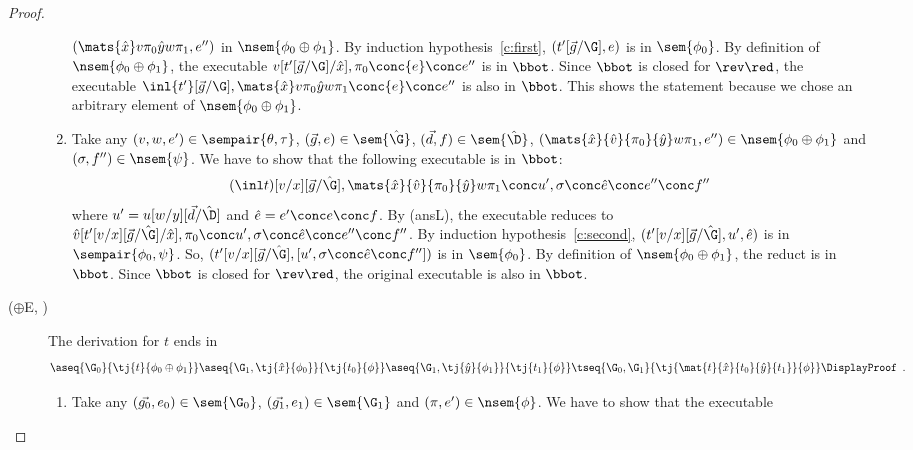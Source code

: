 \begin{proof}
\begin{description}
\begin{enumerate}[label=\textit{(\arabic{*})}]
	       $(\mats {\hat x}v{\pi_0}{\hat y}w{\pi_1}, e'')$
	       in $\nsem{\phi_0\oplus\phi_1}$.
	       By induction hypothesis~\ref{c:first},
	       $(t'[\vec g/\G], e)$ is in $\sem{\phi_0}$.
	       By definition of $\nsem{\phi_0\oplus\phi_1}$,
	       the executable
	       $v[t'[\vec g/\G]/\hat x],\pi_0\conc{e}\conc e''$
	       is in
	       $\bbot$.
	       Since $\bbot$ is closed for $\rev\red$,
	       the executable
	       $\inl{t'}[\vec g/\G], \mats {\hat x}v{\pi_0}{\hat
	       y}w{\pi_1}
	       \conc{e}\conc e''$
	       is also in $\bbot$.
	       This shows the statement because we chose an arbitrary
	       element of $\nsem{\phi_0\oplus\phi_1}$.
	 \item Take any $(v,w,e')\in\sempair{\theta,\tau}$,
	       $(\vec g, e)\in\sem{\hat\G}$,
	       $(\vec d, f)\in\sem{\hat\D}$,
	       $(\mats{\hat x}{\hat v}{\pi_0}{\hat y}w{\pi_1}, e'')\in
	       \nsem{\phi_0\oplus\phi_1}$ and
	       $(\sigma,f'')\in\nsem{\psi}$.
	       We have to show that the following executable is in
	       $\bbot$:
	       \[
		(\inl t)[v/x][\vec g/\hat\G], \mats{\hat x}{\hat v}{\pi_0}{\hat
	       y}w{\pi_1}\conc
	       u',\sigma\conc
	       \hat e\conc e''\conc f''
	       \]
	       where
	       $u' = u[w/y][\vec d/\hat\D]$ and $\hat e=e'\conc  e\conc
	       f$.
	       By (ansL), the executable reduces to
	       $\hat v[t'[v/x][\vec g/\hat\G]/\hat x],\pi_0 \conc
	       u',\sigma\conc
	       \hat e\conc e''\conc f''
	       $.
	       By induction hypothesis~\ref{c:second},
	       $(t'[v/x][\vec g/\hat \G], u', \hat e)$ is in
	       $\sempair{\phi_0,\psi}$.
	       So, $(t'[v/x][\vec g/\hat\G], [u',\sigma\conc \hat e\conc
	       f''])$ is in $\sem{\phi_0}$.
	       By definition of $\nsem{\phi_0\oplus\phi_1}$,
	       the reduct is in $\bbot$.
	       Since $\bbot$ is closed for $\rev\red$,
	       the original executable is also in $\bbot$.
	\end{enumerate}
   \item[($\oplus$E, \textminus)]
	The derivation for $t$ ends in
	\[
	\aseq{\G_0}{\tj{t}{\phi_0\oplus\phi_1}}
	\aseq{\G_1,\tj{\hat{x}}{\phi_0}}{\tj{t_0}{\phi}}
	\aseq{\G_1,\tj{\hat{y}}{\phi_1}}{\tj{t_1}{\phi}}
	\tseq{\G_0,\G_1}{\tj{\mat{t}{\hat x}{t_0}{\hat y}{t_1}}{\phi}}
	\DisplayProof\enspace.
	\]
	\begin{enumerate}[label=\textit{(\arabic{*})}]
	 \item Take any $(\vec{g_0},{e_0})\in\sem{\G_0}$,\quad
	       $(\vec{g_1},{e_1})\in\sem{\G_1}$
	       and
	       $(\pi,e')\in\nsem{\phi}$.
	       We have to show that the executable

\end{enumerate}
\end{description}
\end{proof}
